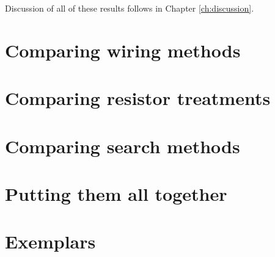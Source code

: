 Discussion of all of these results follows in Chapter \ref{ch:discussion}.

\section{Comparing wiring methods}

\section{Comparing resistor treatments}

\section{Comparing search methods}

\section{Putting them all together}

\section{Exemplars}
